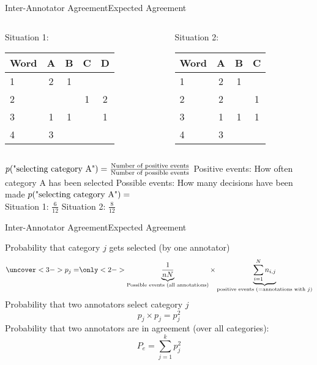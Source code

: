 \documentclass[aspectratio=169]{beamer}
\begin{document}
\begin{frame}{Inter-Annotator Agreement}{Expected Agreement}
	
\begin{columns}[T]
\begin{column}{.45\paperwidth}
Situation 1:

\begin{tabular}{lcccc}
\toprule
Word & A & B & C & D \\
\midrule
1 & 2 & 1 &   &   \\
2 &   &   & 1 & 2 \\
3 & 1 & 1 &   & 1 \\
4 & 3 &   &   &   \\
\bottomrule
\end{tabular}
\end{column}

\begin{column}{.45\paperwidth}
Situation 2:

\begin{tabular}{lccc}
\toprule
Word & A & B & C \\
\midrule
1 & 2 & 1 &   \\
2 & 2 &   & 1 \\
3 & 1 & 1 & 1 \\
4 & 3 &   &   \\
\bottomrule
\end{tabular}
\end{column}
\end{columns}

\begin{outline}
\1 $p(\textnormal{"selecting category A"}) = \frac{\textnormal{Number of positive events}}{\textnormal{Number of possible events}}$
\2 Positive events: How often category A has been selected
\2 Possible events: How many decisions have been made
\1 $p(\textnormal{"selecting category A"}) = $\\
\2 Situation 1: $\frac{6}{12}$
\2 Situation 2: $\frac{8}{12}$
\end{outline}
\end{frame}

\begin{frame}{Inter-Annotator Agreement}{Expected Agreement}
\begin{outline}
\1 Probability that category $j$ gets selected (by one annotator)
\begin{equation}
	\uncover<3->{p_j =} \only<2->{\underbrace{\frac{1}{nN}}_{\textnormal{Possible events (all annotations)}} \times}\underbrace{\sum_{i=1}^N n_{i,j}}_{\textnormal{positive events (=annotations with } j \textnormal{)}}\nonumber
\end{equation}
 Probability that two annotators select category $j$
\begin{equation*}
	p_j \times p_j = p_j^2
\end{equation*}
 Probability that two annotators are in agreement (over all categories):
\begin{equation}
P_e = \sum_{j=1}^k p_j^2\nonumber
\end{equation}
\end{outline}
\end{frame}
\end{document}
